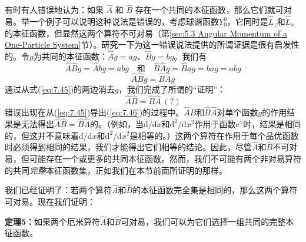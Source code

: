     有时有人错误地认为：如果 $\hat{A}$ 和 $\hat{B}$ 存在一个共同的本征函数，那么它们就可对易。举一个例子可以说明这种说法是错误的，考虑球谐函数$Y_0^0$，它同时是$\hat{L}_z$和$\hat{L}_x$的本征函数，但显然这两个算符不可对易（第\ref{sec:5.3 Angular Momentum of a One-Particle System}节）。研究一下为这一错误说法提供的所谓证据是很有启发性的。令$g$为共同的本征函数：$\hat{A}g = ag$、$\hat{B}g = bg$。我们有
    \begin{equation*}
        \hat{A}\hat{B}g = \hat{A}bg = abg \quad \text{和} \quad \hat{B}\hat{A}g = \hat{B}ag = bag = abg
    \end{equation*}
    \begin{equation}
        \hat{A}\hat{B}g = \hat{B}\hat{A}g
        \label{eq:7.45}
    \end{equation}
    通过从式(\ref{eq:7.45})的两边消去$g$，我们完成了所谓的“证明”：
    \begin{equation}
        \hat{A}\hat{B} = \hat{B}\hat{A}\:(?)
        \label{eq:7.46}
    \end{equation}
    错误出现在从(\ref{eq:7.45})导出(\ref{eq:7.46})的过程中。$\hat{A}\hat{B}$和$\hat{B}\hat{A}$对单个函数$g$的作用结果是无法得出$\hat{A}\hat{B} = \hat{B}\hat{A}$的。（例如，当$\mathrm{d}/\mathrm{d}x$和$\mathrm{d}^2/\mathrm{d}x^2$作用于函数$\mathrm{e}^x$时，结果是相同的，但这并不意味着$\mathrm{d}/\mathrm{d}x$和$\mathrm{d}^2/\mathrm{d}x^2$是相等的。）这两个算符在作用于每个品优函数时必须得到相同的结果，我们才能得出它们相等的结论。因此，尽管$\hat{A}$和$\hat{B}$不可对易，但可能存在一个或更多的共同本征函数。然而，我们不可能有两个非对易算符的共同\textit{完整}本征函数集，正如我们在本节前面所证明的那样。

    我们已经证明了：若两个算符$\hat{A}$和$\hat{B}$的本征函数完全集是相同的，那么这两个算符可对易。现在我们证明：
    \begin{center}
        \parbox{0.8\textwidth}{
            \centering
            \textbf{定理5：}如果两个厄米算符$\hat{A}$和$\hat{B}$可对易，我们可以为它们选择一组共同的完整本征函数。
        }
    \end{center}

